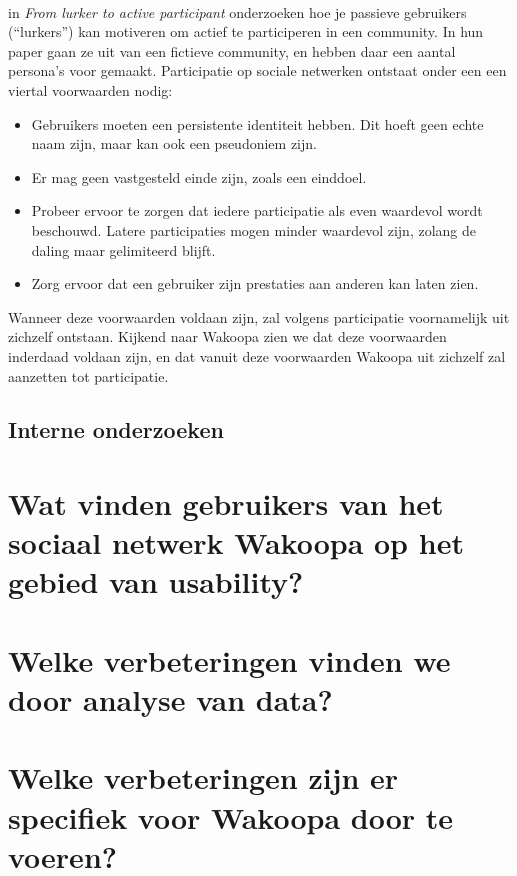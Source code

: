 \documentclass[a4paper, 10pt, pdftex]{article}
\begin{document}
    \paragraph{\cite{Sloep2009}}

    in \emph{From lurker to active participant} onderzoeken \citeauthor{Sloep2009} hoe je passieve gebruikers (``lurkers'') kan motiveren om actief te participeren in een community. In hun paper gaan ze uit van een fictieve community, en hebben daar een aantal persona's voor gemaakt. Participatie op sociale netwerken ontstaat onder een een viertal voorwaarden nodig:
    \begin{itemize}
    \item Gebruikers moeten een persistente identiteit hebben. Dit hoeft geen echte naam zijn, maar kan ook een pseudoniem zijn.
    \item Er mag geen vastgesteld einde zijn, zoals een einddoel.
    \item Probeer ervoor te zorgen dat iedere participatie als even waardevol wordt beschouwd. Latere participaties mogen minder waardevol zijn, zolang de daling maar gelimiteerd blijft.
    \item Zorg ervoor dat een gebruiker zijn prestaties aan anderen kan laten zien.
    \end{itemize}
    Wanneer deze voorwaarden voldaan zijn, zal volgens \citeauthor{Sloep2009} participatie voornamelijk uit zichzelf ontstaan. Kijkend naar Wakoopa zien we dat deze voorwaarden inderdaad voldaan zijn, en dat vanuit deze voorwaarden Wakoopa uit zichzelf zal aanzetten tot participatie.


  \subsection{Interne onderzoeken}


  \newpage
  \section{Wat vinden gebruikers van het sociaal netwerk Wakoopa op het gebied van usability?}

  \newpage
  \section{Welke verbeteringen vinden we door analyse van data?}
    \label{datachapter}
  \newpage
  \section{Welke verbeteringen zijn er specifiek voor Wakoopa door te voeren?}
\end{document}

